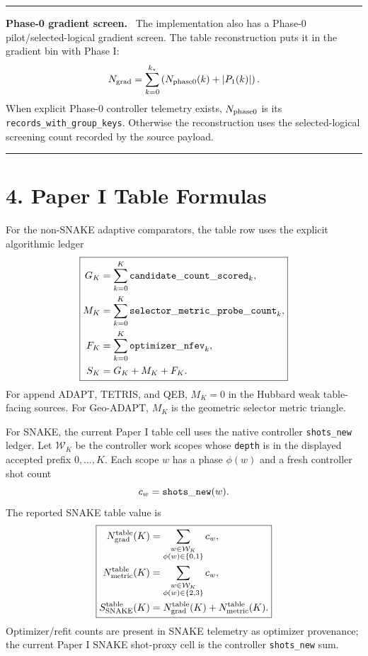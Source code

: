 \documentclass[10pt,twocolumn]{article}
\newcommand{\Wcal}{\mathcal W}
\newcommand{\Ssnake}{S_{\rm SNAKE}}
\newcommand{\Ngrad}{N_{\rm grad}}
\newcommand{\Nmetric}{N_{\rm metric}}
\newcommand{\boxline}{\vspace{2pt}\hrule\vspace{3pt}}
\newenvironment{primerbox}[1]{%
  \boxline\begingroup\raggedright\textbf{#1.}\ }{\par\endgroup\boxline}
\begin{document}
\begin{primerbox}{Phase-0 gradient screen}
The implementation also has a Phase-0 pilot/selected-logical gradient screen.
The table reconstruction puts it in the gradient bin with Phase I:
\[
  \Ngrad
  =
  \sum_{k=0}^{k_\star}
  \left(N_{\rm phase0}(k)+|P_1(k)|\right).
\]
When explicit Phase-0 controller telemetry exists, \(N_{\rm phase0}\) is its
\texttt{records\_with\_group\_keys}.  Otherwise the reconstruction uses the
selected-logical screening count recorded by the source payload.
\end{primerbox}

\section*{4. Paper I Table Formulas}

For the non-SNAKE adaptive comparators, the table row uses the explicit
algorithmic ledger
\[
\boxed{
\begin{aligned}
G_K&=\sum_{k=0}^{K}{\tt candidate\_count\_scored}_k,\\
M_K&=\sum_{k=0}^{K}{\tt selector\_metric\_probe\_count}_k,\\
F_K&=\sum_{k=0}^{K}{\tt optimizer\_nfev}_k,\\
S_K&=G_K+M_K+F_K.
\end{aligned}}
\]
For append ADAPT, TETRIS, and QEB, \(M_K=0\) in the Hubbard weak table-facing
sources.  For Geo-ADAPT, \(M_K\) is the geometric selector metric triangle.

For SNAKE, the current Paper I table cell uses the native controller
\texttt{shots\_new} ledger.  Let \(\Wcal_K\) be the controller work scopes
whose \texttt{depth} is in the displayed accepted prefix \(0,\ldots,K\).  Each
scope \(w\) has a phase \(\phi(w)\) and a fresh controller shot count
\[
  c_w={\tt shots\_new}(w).
\]
The reported SNAKE table value is
\[
\boxed{
\begin{aligned}
\Ngrad^{\rm table}(K)
&=
\sum_{\substack{w\in\Wcal_K\\ \phi(w)\in\{0,1\}}} c_w,\\
\Nmetric^{\rm table}(K)
&=
\sum_{\substack{w\in\Wcal_K\\ \phi(w)\in\{2,3\}}} c_w,\\
\Ssnake^{\rm table}(K)
&=
\Ngrad^{\rm table}(K)+\Nmetric^{\rm table}(K).
\end{aligned}
}
\]
Optimizer/refit counts are present in SNAKE telemetry as optimizer provenance;
the current Paper I SNAKE shot-proxy cell is the controller
\texttt{shots\_new} sum.
\end{document}
